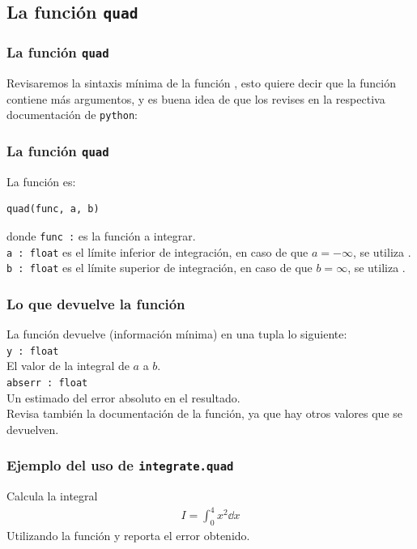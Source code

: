 \subsection{La función \texttt{quad}}
\begin{frame}[fragile]
\frametitle{La función \texttt{quad}}
Revisaremos la sintaxis mínima de la función , esto quiere decir que la función contiene más argumentos, y es buena idea de que los revises en la respectiva documentación de \texttt{python}:
\end{frame}
\begin{frame}[fragile]
\frametitle{La función \texttt{quad}}
La función es:
\begin{verbatim}
quad(func, a, b)
\end{verbatim}
donde
\verb|func :|  es la función a integrar.
\\
\medskip
\verb|a : float| es el límite inferior de integración, en caso de que  $a = -\infty$, se utiliza .
\\
\medskip
\verb|b : float| es el límite superior de integración, en caso de que  $b = \infty$, se utiliza .
\end{frame}
\begin{frame}[fragile]
\frametitle{Lo que devuelve la función}
La función  devuelve (información mínima) en una tupla lo siguiente:
\\
\bigskip
\verb|y : float| \\
El valor de la integral de $a$ a $b$.
\\
\medskip
\verb|abserr : float| \\
Un estimado del error absoluto en el resultado.
\\
\bigskip
Revisa también la documentación de la función, ya que hay otros valores que se devuelven.
\end{frame}
\begin{frame}[fragile]
\frametitle{Ejemplo del uso de \texttt{integrate.quad}}
Calcula la integral
\begin{align*}
I = \int_{0}^{4} x^{2} \dd{x}
\end{align*}
Utilizando la función  y reporta el error obtenido.
\end{frame}
